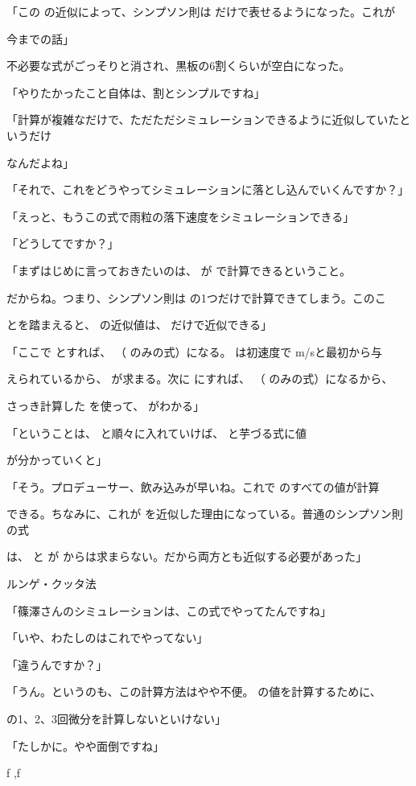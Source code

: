 「この の近似によって、シンプソン則は だけで表せるようになった。これが\par
今までの話」\par
不必要な式がごっそりと消され、黒板の6割くらいが空⽩になった。\par
「やりたかったこと⾃体は、割とシンプルですね」\par
「計算が複雑なだけで、ただただシミュレーションできるように近似していたというだけ\par
なんだよね」\par
「それで、これをどうやってシミュレーションに落とし込んでいくんですか？」\par
「えっと、もうこの式で⾬粒の落下速度をシミュレーションできる」\par
「どうしてですか？」\par
「まずはじめに⾔っておきたいのは、 が で計算できるということ。\par
だからね。つまり、シンプソン則は の1つだけで計算できてしまう。このこ\par
とを踏まえると、 の近似値は、 だけで近似できる」\par
「ここで とすれば、 （ のみの式）になる。 は初速度で  m/sと最初から与\par
えられているから、 が求まる。次に にすれば、 （ のみの式）になるから、\par
さっき計算した を使って、 がわかる」\par
「ということは、 と順々に⼊れていけば、 と芋づる式に値\par
が分かっていくと」\par
「そう。プロデューサー、飲み込みが早いね。これで のすべての値が計算\par
できる。ちなみに、これが を近似した理由になっている。普通のシンプソン則の式\par
は、 と が からは求まらない。だから両⽅とも近似する必要があった」\par
ルンゲ‧クッタ法\par
「篠澤さんのシミュレーションは、この式でやってたんですね」\par
「いや、わたしのはこれでやってない」\par
「違うんですか？」\par
「うん。というのも、この計算⽅法はやや不便。 の値を計算するために、\par
の1、2、3回微分を計算しないといけない」\par
「たしかに。やや⾯倒ですね」\par
f  ,f\par
